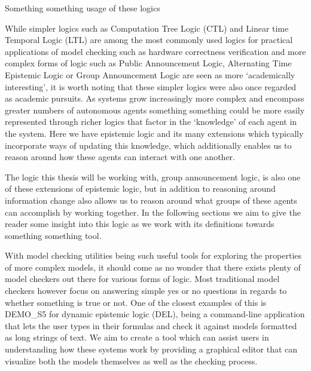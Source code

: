 
Something something usage of these logics


While simpler logics such as Computation Tree Logic (CTL) and Linear time Temporal Logic (LTL) are among the most commonly used logics  for practical applications of model checking such as hardware correctness verification and more complex forms of logic such as Public Announcement Logic, Alternating Time Epistemic Logic or Group Announcement Logic are seen as more `academically interesting', it is worth noting that these simpler logics were also once regarded as academic pursuits. As systems grow increasingly more complex and encompass greater numbers of autonomous agents something something could be more easily represented through richer logics that factor in the `knowledge' of each agent in the system. Here we have epistemic logic and its many extensions which typically incorporate ways of updating this knowledge, which additionally enables us to reason around how these agents can interact with one another.

The logic this thesis will be working with, group announcement logic, is also one of these extensions of epistemic logic, but in addition to reasoning around information change also allows us to reason around what groups of these agents can accomplish by working together. In the following sections we aim to give the reader some insight into this logic as we work with its definitions towards something something tool.



With model checking utilities being such useful tools for exploring the properties of more complex models, it should come as no wonder that there exists plenty of model checkers out there for various forms of logic. Most traditional model checkers however focus on answering simple yes or no questions in regards to whether something is true or not. One of the closest examples of this is DEMO\_S5 for dynamic epistemic logic (DEL), being a command-line application that lets the user types in their formulas and check it against models formatted as long strings of text. We aim to create a tool which can assist users in understanding how these systems work by providing a graphical editor that can visualize both the models themselves as well as the checking process.


